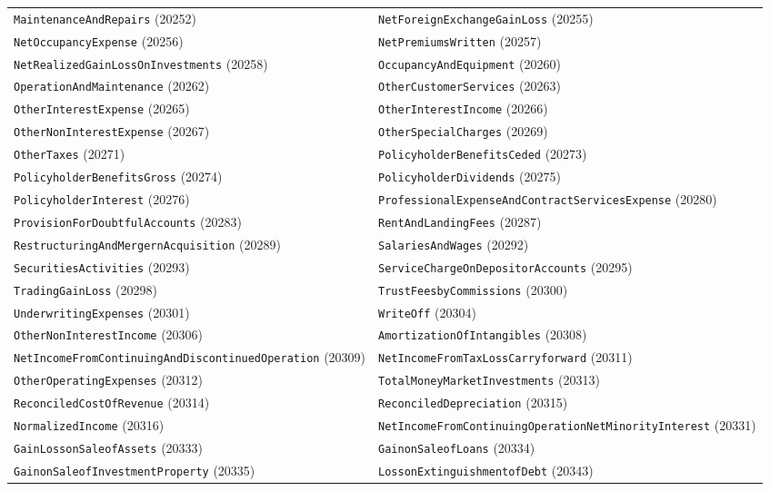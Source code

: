 \documentclass[11pt,a4paper]{report}
\begin{document}
\begin{subappendices}
{\begin{longtable}{@{}p{}p{}@{}}
\texttt{MaintenanceAndRepairs} (20252) & \texttt{NetForeignExchangeGainLoss} (20255) \\
\texttt{NetOccupancyExpense} (20256) & \texttt{NetPremiumsWritten} (20257) \\
\texttt{NetRealizedGainLossOnInvestments} (20258) & \texttt{OccupancyAndEquipment} (20260) \\
\texttt{OperationAndMaintenance} (20262) & \texttt{OtherCustomerServices} (20263) \\
\texttt{OtherInterestExpense} (20265) & \texttt{OtherInterestIncome} (20266) \\
\texttt{OtherNonInterestExpense} (20267) & \texttt{OtherSpecialCharges} (20269) \\
\texttt{OtherTaxes} (20271) & \texttt{PolicyholderBenefitsCeded} (20273) \\
\texttt{PolicyholderBenefitsGross} (20274) & \texttt{PolicyholderDividends} (20275) \\
\texttt{PolicyholderInterest} (20276) & \texttt{ProfessionalExpenseAndContractServicesExpense} (20280) \\
\texttt{ProvisionForDoubtfulAccounts} (20283) & \texttt{RentAndLandingFees} (20287) \\
\texttt{RestructuringAndMergernAcquisition} (20289) & \texttt{SalariesAndWages} (20292) \\
\texttt{SecuritiesActivities} (20293) & \texttt{ServiceChargeOnDepositorAccounts} (20295) \\
\texttt{TradingGainLoss} (20298) & \texttt{TrustFeesbyCommissions} (20300) \\
\texttt{UnderwritingExpenses} (20301) & \texttt{WriteOff} (20304) \\
\texttt{OtherNonInterestIncome} (20306) & \texttt{AmortizationOfIntangibles} (20308) \\
\texttt{NetIncomeFromContinuingAndDiscontinuedOperation} (20309) & \texttt{NetIncomeFromTaxLossCarryforward} (20311) \\
\texttt{OtherOperatingExpenses} (20312) & \texttt{TotalMoneyMarketInvestments} (20313) \\
\texttt{ReconciledCostOfRevenue} (20314) & \texttt{ReconciledDepreciation} (20315) \\
\texttt{NormalizedIncome} (20316) & \texttt{NetIncomeFromContinuingOperationNetMinorityInterest} (20331) \\
\texttt{GainLossonSaleofAssets} (20333) & \texttt{GainonSaleofLoans} (20334) \\
\texttt{GainonSaleofInvestmentProperty} (20335) & \texttt{LossonExtinguishmentofDebt} (20343) \\

\end{longtable}}
\end{subappendices}
\end{document}
